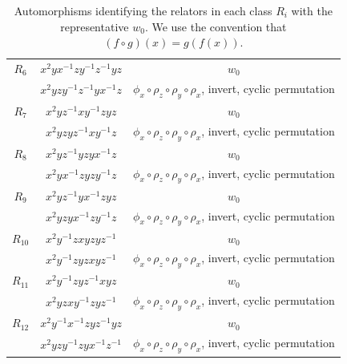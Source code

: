 \documentclass[a4paper,12pt,oneside]{article}
\begin{document}
\begin{table}[h!]
\begin{tabular}{|c|c|c|}
\hline
$R_6$ & $x^2 y x^{-1} z y^{-1} z^{-1} y z$ & $w_0$  \\
      & $x^2 y z y^{-1} z^{-1} y x^{-1} z$ & $\phi_x\circ\rho_z \circ \rho_y \circ \rho_x$, invert, cyclic permutation \\
\hline
$R_7$ & $x^2 y z^{-1} x y^{-1} z y z$ & $w_0$  \\
      & $x^2 y z y z^{-1} x y^{-1} z$ & $\phi_x\circ\rho_z \circ \rho_y \circ \rho_x$, invert, cyclic permutation \\
\hline
$R_8$ & $x^2 y z^{-1} y z y x^{-1} z$ & $w_0$  \\
      & $x^2 y x^{-1} z y z y^{-1} z$ & $\phi_x\circ\rho_z \circ \rho_y \circ \rho_x$, invert, cyclic permutation \\
\hline
$R_9$ & $x^2 y z^{-1} y x^{-1} z y z$ & $w_0$  \\
      & $x^2 y z y x^{-1} z y^{-1} z$ & $\phi_x\circ\rho_z \circ \rho_y \circ \rho_x$, invert, cyclic permutation \\
\hline
$R_{10}$ & $x^2 y^{-1} z x y z y z^{-1}$ & $w_0$  \\
         & $x^2 y^{-1} z y z x y z^{-1}$ & $\phi_x\circ\rho_z \circ \rho_y \circ \rho_x$, invert, cyclic permutation \\
\hline
$R_{11}$ & $x^2 y^{-1} z y z^{-1} x y z$ & $w_0$  \\
         & $x^2 y z x y^{-1} z y z^{-1}$ & $\phi_x\circ\rho_z \circ \rho_y \circ \rho_x$, invert, cyclic permutation \\
\hline
$R_{12}$ & $x^2 y^{-1} x^{-1} z y z^{-1} y z$ & $w_0$  \\
         & $x^2 y z y^{-1} z y x^{-1} z^{-1}$ & $\phi_x\circ\rho_z \circ \rho_y \circ \rho_x$, invert, cyclic permutation \\
\hline
\end{tabular}
\caption{Automorphisms identifying the relators in each class $R_i$ with the representative $w_0$. We use the convention that $(f\circ g)(x)=g(f(x))$.}
\label{tab:appendix-maps}
\end{table}
\newpage
\end{document}
